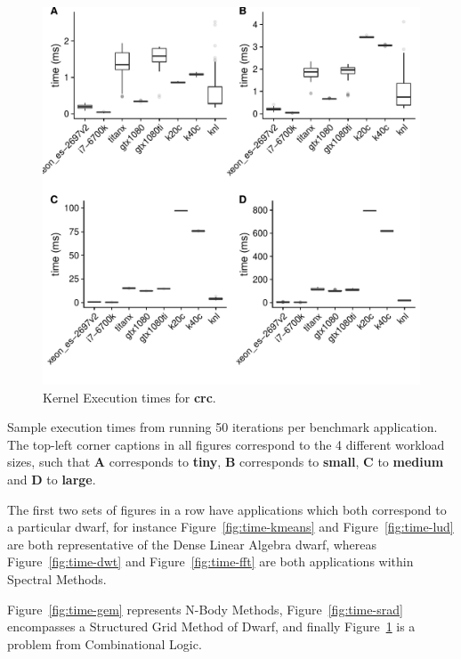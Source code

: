 \documentclass[../document.tex]{subfiles}
\begin{document}
\begin{figure}
\centering
\includegraphics[width=1\textwidth]{figures/time-results/crc.pdf}
\caption{Kernel Execution times for {\bf crc}.}
\label{fig:time-crc}
\end{figure}

Sample execution times from running 50 iterations per benchmark application.
The top-left corner captions in all figures correspond to the 4 different workload sizes, such that {\bf A} corresponds to {\bf tiny}, {\bf B} corresponds to {\bf small}, {\bf C} to {\bf medium} and {\bf D} to {\bf large}.

The first two sets of figures in a row have applications which both correspond to a particular dwarf, for instance Figure~\ref{fig:time-kmeans} and Figure~\ref{fig:time-lud} are both representative of the Dense Linear Algebra dwarf, whereas Figure~\ref{fig:time-dwt} and Figure~\ref{fig:time-fft} are both applications within Spectral Methods.

Figure~\ref{fig:time-gem} represents N-Body Methods, Figure~\ref{fig:time-srad} encompasses a Structured Grid Method of Dwarf, and finally Figure~\ref{fig:time-crc} is a problem from Combinational Logic.
\end{document}
